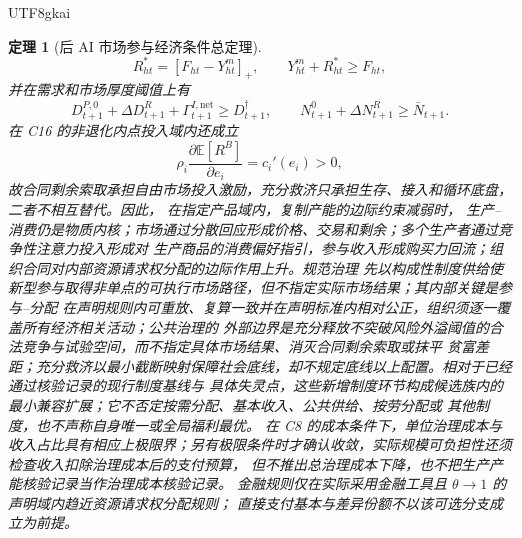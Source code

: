 \documentclass[12pt,a4paper,openany]{report}
\newtheorem{theorem}{定理}[chapter]
\newcommand{\EE}{\mathbb E}
\begin{document}
\begin{CJK*}{UTF8}{gkai}
\begin{theorem}[后 AI 市场参与经济条件总定理]
\[
  R_{ht}^{*}=[F_{ht}-Y_{ht}^{m}]_+,
  \qquad
  Y_{ht}^{m}+R_{ht}^{*}\ge F_{ht},
\]
并在需求和市场厚度阈值上有
\[
  D_{t+1}^{P,0}+\Delta D_{t+1}^{R}
  +\Gamma_{t+1}^{I,\mathrm{net}}
  \ge D_{t+1}^{\dagger},
  \qquad
  N_{t+1}^{0}+\Delta N_{t+1}^{R}\ge\bar N_{t+1}.
\]
在 C16 的非退化内点投入域内还成立
\[
  \rho_i
  \frac{\partial\EE[R^B]}{\partial e_i}
  =c_i'(e_i)>0,
\]
故合同剩余索取承担自由市场投入激励，充分救济只承担生存、接入和循环底盘，二者不相互替代。因此，
在指定产品域内，复制产能的边际约束减弱时，
生产--消费仍是物质内核；市场通过分散回应形成价格、交易和剩余；多个生产者通过竞争性注意力投入形成对
生产商品的消费偏好指引，参与收入形成购买力回流；组织合同对内部资源请求权分配的边际作用上升。规范治理
先以构成性制度供给使新型参与取得非单点的可执行市场路径，但不指定实际市场结果；其内部关键是参与--分配
在声明规则内可重放、复算一致并在声明标准内相对公正，组织须逐一覆盖所有经济相关活动；公共治理的
外部边界是充分释放不突破风险外溢阈值的合法竞争与试验空间，而不指定具体市场结果、消灭合同剩余索取或抹平
贫富差距；充分救济以最小截断映射保障社会底线，却不规定底线以上配置。相对于已经通过核验记录的现行制度基线与
具体失灵点，这些新增制度环节构成候选族内的最小兼容扩展；它不否定按需分配、基本收入、公共供给、按劳分配或
其他制度，也不声称自身唯一或全局福利最优。
在 C8 的成本条件下，单位治理成本与收入占比具有相应上极限界；另有极限条件时才确认收敛，实际规模可负担性还须检查收入扣除治理成本后的支付预算，
但不推出总治理成本下降，也不把生产产能核验记录当作治理成本核验记录。
金融规则仅在实际采用金融工具且 \(\theta\to1\) 的声明域内趋近资源请求权分配规则；
直接支付基本与差异份额不以该可选分支成立为前提。
\end{theorem}


\end{CJK*}
\end{document}
